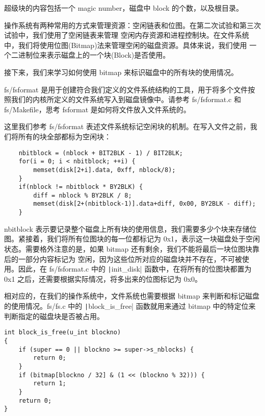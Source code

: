 超级块的内容包括一个 magic number，磁盘中 block 的个数，以及根目录。

操作系统有两种常用的方式来管理资源：空闲链表和位图。在第二次试验和第三次试验中，我们使用了空闲链表来管理
空闲内存资源和进程控制块。在文件系统中，我们将使用位图(Bitmap)法来管理空闲的磁盘资源。具体来说，我们使用
一个二进制位来表示磁盘上的一个块(Block)是否使用。

接下来，我们来学习如何使用 bitmap 来标识磁盘中的所有块的使用情况。

\begin{note}
	fs/fsformat 是用于创建符合我们定义的文件系统结构的工具，用于将多个文件按照我们的内核所定义的文件系统写入到磁盘镜像中。请参考 fs/fsformat.c 和 fs/Makefile，思考 fsformat 是如何将文件放入文件系统的。
\end{note}

这里我们参考 fs/fsformat 表述文件系统标记空闲块的机制。在写入文件之前，我们将所有的块全部都标为空闲块：

\begin{verbatim}
    nbitblock = (nblock + BIT2BLK - 1) / BIT2BLK;
    for(i = 0; i < nbitblock; ++i) {
        memset(disk[2+i].data, 0xff, nblock/8);
    }
    if(nblock != nbitblock * BY2BLK) {
        diff = nblock % BY2BLK / 8;
        memset(disk[2+(nbitblock-1)].data+diff, 0x00, BY2BLK - diff);
    }
\end{verbatim}

nbitblock 表示要记录整个磁盘上所有块的使用信息，我们需要多少个块来存储位图。紧接着，我们将所有位图块的每一位都标记为
0x1，表示这一块磁盘处于空闲状态。需要格外注意的是，如果 bitmap 还有剩余，我们不能将最后一块位图块靠后的一部分内容标记为
空闲，因为这些位所对应的磁盘块并不存在，不可被使用。因此，在 fs/fsformat.c 中的 \texttt|init_disk|
函数中，在将所有的位图块都置为 0x1 之后，还需要根据实际情况，将多出来的位图标记为 0x0。

相对应的，在我们的操作系统中，文件系统也需要根据 bitmap 来判断和标记磁盘的使用情况。fs/fs.c 中的 \texttt|block_is_free|
函数就用来通过 bitmap 中的特定位来判断指定的磁盘块是否被占用。

\begin{verbatim}
int block_is_free(u_int blockno)
{
    if (super == 0 || blockno >= super->s_nblocks) {
        return 0;
    }
    if (bitmap[blockno / 32] & (1 << (blockno % 32))) {
        return 1;
    }
    return 0;
}
\end{verbatim}

